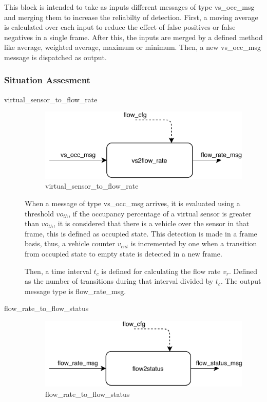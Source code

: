 \begin{description}
This block is intended to take as inputs different messages of type vs\_occ\_msg and merging them to increase the reliabilty of detection. First, a moving average is calculated over each input to reduce the effect of false positives or false negatives in a single frame. After this, the inputs are merged by a defined method like average, weighted average, maximum or minimum. Then, a new vs\_occ\_msg message is dispatched as output.

\end{description}


\subsubsection{Situation Assesment}
\begin{description}

\item[virtual\_sensor\_to\_flow\_rate] \hfill
\begin{figure}[ht!]
\centering
\includegraphics[scale=1]{fig/3/vs2flow.pdf}
\caption{virtual\_sensor\_to\_flow\_rate}
\label{virtual_sensor_to_flow_status}
\end{figure}

When a message of type vs\_occ\_msg arrives, it is evaluated using a threshold $vo_{th}$, if the occupancy percentage of a virtual sensor is greater than $vo_{th}$, it is considered that there is a vehicle over the sensor in that frame, this is defined as occupied state. This detection is made in a frame basis, thus, a vehicle counter $v_{cnt}$ is incremented by one when a transition from occupied state to empty state is detected in a new frame.

Then, a time interval $t_{c}$ is defined for calculating the flow rate $v_{r}$. Defined as the number of transitions during that interval divided by $t_{c}$. The output message type is flow\_rate\_msg.

\item[flow\_rate\_to\_flow\_status] \hfill
\begin{figure}[ht!]
\centering
\includegraphics[scale=1]{fig/3/flow2status.pdf}
\caption{flow\_rate\_to\_flow\_status}
\label{flow_rate_to_flow_status}
\end{figure}



\end{description}
